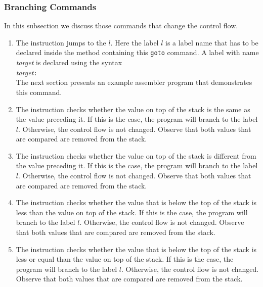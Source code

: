 \subsubsection{Branching Commands}
In this subsection we discuss those commands that change the control flow.
\begin{enumerate}
\item The instruction 
      jumps to the  $l$.  Here the label $l$ is a label name that has to be declared inside the
      method containing this \texttt{goto} command.  A label with name \textsl{target} is declared using the syntax
      \\[0.2cm]
      \hspace*{1.3cm}
      \textsl{target}\texttt{:}
      \\[0.2cm]
      The next section presents an example assembler program that demonstrates this command.
\item The instruction 
      checks whether the value on top of the stack is the same as the value preceding it.  If this is
      the case, the program will branch 
      to the label $l$.  Otherwise, the control flow is not changed.  Observe that both values that are
      compared are removed from the stack.
\item The instruction 
      checks whether the value on top of the stack is different from the value preceding it.  If this is
      the case, the program will branch to the label $l$.  Otherwise, the control flow is not
      changed.  Observe that both values that are compared are removed from the stack.

\item The instruction 
      checks whether the value that is below the top of the stack is less than the value on top of
      the stack.  If this is the case, the program will branch 
      to the label $l$.  Otherwise, the control flow is not changed.  Observe that both values that are
      compared are removed from the stack.

\item The instruction 
      checks whether the value that is below the top of the stack is less or equal than the value on top
      of the stack.  If this is the case, the program will branch 
      to the label $l$.  Otherwise, the control flow is not changed.  Observe that both values that are
      compared are removed from the stack.
      

\end{enumerate}
